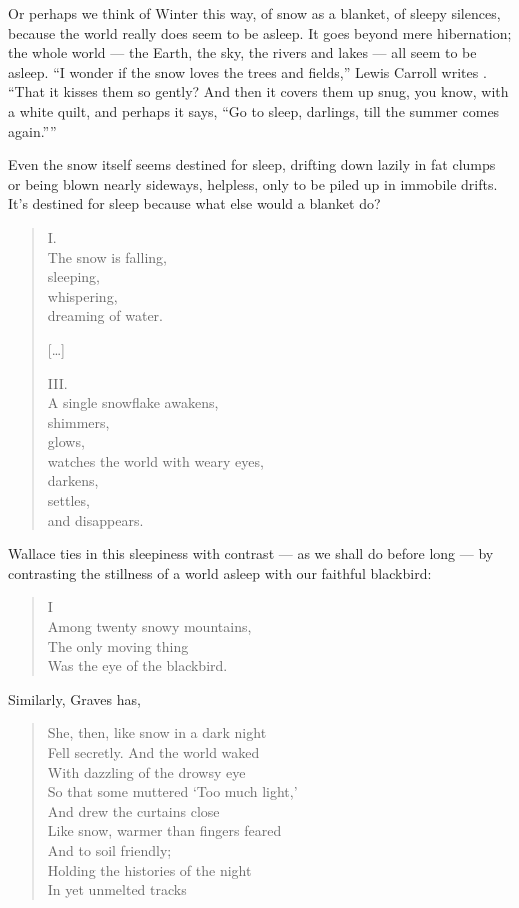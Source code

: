 \documentclass[12pt,oneside]{memoir}
\begin{document}
Or perhaps we think of Winter this way, of snow as a blanket, of sleepy silences, because the world really does seem to be asleep. It goes beyond mere hibernation; the whole world --- the Earth, the sky, the rivers and lakes --- all seem to be asleep. ``I wonder if the snow loves the trees and fields,'' Lewis Carroll writes \parencite{carroll}. ``That it kisses them so gently? And then it covers them up snug, you know, with a white quilt, and perhaps it says, ``Go to sleep, darlings, till the summer comes again.''''

Even the snow itself seems destined for sleep, drifting down lazily in fat clumps or being blown nearly sideways, helpless, only to be piled up in immobile drifts. It's destined for sleep because what else would a blanket do?

\begin{verse}
I. \\
The snow is falling, \\
sleeping, \\
whispering, \\
dreaming of water.

{[\ldots]}

III. \\
A single snowflake awakens, \\
shimmers, \\
glows, \\
watches the world with weary eyes, \\
darkens, \\
settles, \\
and disappears.

\parencite{esch}
\end{verse}

Wallace ties in this sleepiness with contrast --- as we shall do before long --- by contrasting the stillness of a world asleep with our faithful blackbird:

\begin{verse}
I \\
Among twenty snowy mountains, \\
The only moving thing \\
Was the eye of the blackbird.

\parencite{blackbird}
\end{verse}

Similarly, Graves has,

\begin{verse}
She, then, like snow in a dark night \\
Fell secretly. And the world waked \\
With dazzling of the drowsy eye \\
So that some muttered `Too much light,' \\
And drew the curtains close \\
Like snow, warmer than fingers feared \\
And to soil friendly; \\
Holding the histories of the night \\
In yet unmelted tracks

\parencite[143]{graves_poems}
\end{verse}
\end{document}
